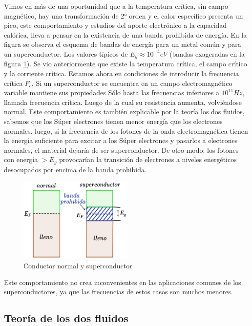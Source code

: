 Vimos en más de una oportunidad que a la temperatura crítica, sin campo magnético, hay una transformación de 2° orden y el calor específico presenta un pico, este comportamiento y estudios del aporte electrónico a la capacidad calórica, lleva a pensar en la existencia de una banda prohibida de energía. En la figura se observa el esquema de bandas de energía para un metal común y para un superconductor. Los valores típicos de $E_{g}\approx 10^{-4}eV$ (bandas exageradas en la figura \ref{fig:434}). Se vio anteriormente que existe la temperatura crítica, el campo crítico y la corriente crítica. Estamos ahora en condiciones de introducir la frecuencia crítica $F_{c}$. Si un superconductor se encuentra en un campo electromagnético variable mantiene sus propiedades Sólo hasta las frecuencias inferiores a $10^{11}Hz$, llamada frecuencia crítica. Luego de la cual su resistencia aumenta, volviéndose normal. Este comportamiento es también explicable por la teoría los dos fluidos, sabemos que los Súper electrones tienen menor energía que los electrones normales. luego, si la frecuencia de los fotones de la onda electromagnética tienen la energía suficiente para excitar a los Súper electrones y pasarlos a electrones normales, el material dejaría de ser superconductor. De otro modo; los fotones con energía $>E_{g}$ provocarían la transición de electrones a niveles energéticos desocupados por encima de la banda prohibida.

\begin{figure}[H]
    \centering
    \includegraphics[width=0.5\textwidth]{./Figures/fig434}
	\caption{Conductor normal y superconductor}
	\label{fig:434}
\end{figure}

Este comportamiento no crea inconvenientes en las aplicaciones comunes de los superconductores, ya que las frecuencias de estos casos son muchos menores.

\subsection{Teoría de los dos fluidos}

